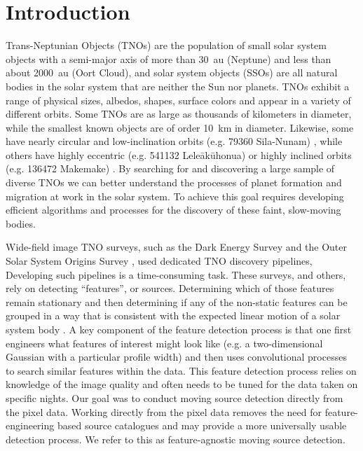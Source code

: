 \documentclass{aastex631}
\begin{document}
\section{Introduction} \label{sec:intro}
Trans-Neptunian Objects (TNOs) are the population of small solar system objects with a semi-major axis of more than 30~au (Neptune) and less than about 2000~au (Oort Cloud), and solar system objects (SSOs) are all natural bodies in the solar system that are neither the Sun nor planets.
TNOs exhibit a range of physical sizes, albedos, shapes, surface colors and appear in a variety of different orbits.
Some TNOs are as large as thousands of kilometers in diameter, while the smallest known objects are of order 10~km in diameter.
Likewise, some have nearly circular and low-inclination orbits (e.g. 79360 Sila-Nunam) \citep{1997MPEC....N...08L}, while others have highly eccentric (e.g. 541132 Leleākūhonua) \citep{2019AJ....157..139S} or highly inclined orbits (e.g. 136472 Makemake) \citep{2005IAUC.8577....1B}.
By searching for and discovering a large sample of diverse TNOs we can better understand the processes of planet formation and migration at work in the solar system.  
To achieve this goal requires developing efficient algorithms and processes for the discovery of these faint, slow-moving bodies.

Wide-field image TNO surveys, such as the Dark Energy Survey \citep{2020ApJS..247...32B} and the Outer Solar System Origins Survey \citep{2016AJ....152...70B}, used dedicated TNO discovery pipelines, Developing such pipelines is a time-consuming task.
These surveys, and others, rely on detecting ``features'', or sources. 
Determining which of those features remain stationary and then determining if any of the non-static features can be grouped in a way that is consistent with the expected linear motion of a solar system body \citep[see][for a complete description of such a detection system]{2004MNRAS.347..471P}.
A key component of the feature detection process is that one first engineers what features of interest might look like (e.g. a two-dimensional Gaussian with a particular profile width) and then uses convolutional processes to search similar features within the data.
This feature detection process relies on knowledge of the image quality and often needs to be tuned for the data taken on specific nights.
Our goal was to conduct moving source detection directly from the pixel data.
Working directly from the pixel data removes the need for feature-engineering based source catalogues \citep[section 3]{2016AJ....151..158F} and may provide a more universally usable detection process.
We refer to this as feature-agnostic moving source detection.
\end{document}

